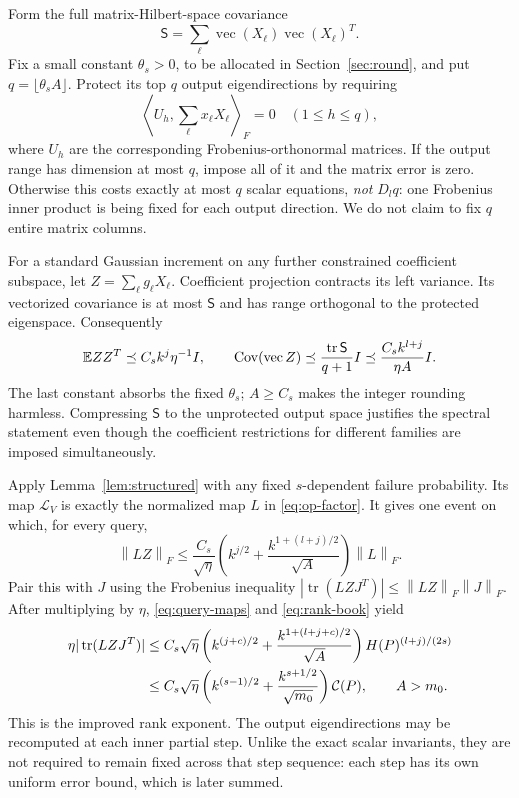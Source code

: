 \documentclass[11pt]{article}
\theoremstyle{remark}\newtheorem{remark}[theorem]{Remark}
\newcommand{\tr}{\operatorname{tr}}\newcommand{\rank}{\operatorname{rank}}
\newcommand{\norm}[1]{\left\|#1\right\|}\newcommand{\ip}[2]{\left\langle #1,#2\right\rangle}
\newcommand{\cost}{\mathcal C}\newcommand{\OPT}{\mathsf{OPT}}
\begin{document}
Form the full matrix-Hilbert-space covariance
\[
 \mathsf S=\sum_\ell\operatorname{vec}(X_\ell)\operatorname{vec}(X_\ell)^T.
\]
Fix a small constant $\theta_s>0$, to be allocated in Section~\ref{sec:round}, and put $q=\lfloor\theta_s A\rfloor$. Protect its top $q$ output eigendirections by requiring
\begin{equation}\label{eq:new-constraints}
 \left\langle U_h,\sum_\ell x_\ell X_\ell\right\rangle_F=0
 \quad(1\le h\le q),
\end{equation}
where $U_h$ are the corresponding Frobenius-orthonormal matrices. If the output range has dimension at most $q$, impose all of it and the matrix error is zero. Otherwise this costs exactly at most $q$ scalar equations, \emph{not} $D_lq$: one Frobenius inner product is being fixed for each output direction. We do not claim to fix $q$ entire matrix columns.

For a standard Gaussian increment on any further constrained coefficient subspace, let $Z=\sum_\ell g_\ell X_\ell$. Coefficient projection contracts its left variance. Its vectorized covariance is at most $\mathsf S$ and has range orthogonal to the protected eigenspace. Consequently
\begin{equation}\label{eq:new-fullcov}
 \E ZZ^T\preceq C_s k^j\eta^{-1}I,\qquad
 \operatorname{Cov}(\operatorname{vec}Z)
 \preceq\frac{\tr\mathsf S}{q+1}I
 \preceq\frac{C_s k^{l+j}}{\eta A}I.
\end{equation}
The last constant absorbs the fixed $\theta_s$; $A\ge C_s$ makes the integer rounding harmless. Compressing $\mathsf S$ to the unprotected output space justifies the spectral statement even though the coefficient restrictions for different families are imposed simultaneously.

Apply Lemma~\ref{lem:structured} with any fixed $s$-dependent failure probability. Its map $\mathcal L_V$ is exactly the normalized map $L$ in \eqref{eq:op-factor}. It gives one event on which, for every query,
\begin{equation}\label{eq:new-structured-cost}
 \norm{LZ}_F
 \le\frac{C_s}{\sqrt\eta}
 \left(k^{j/2}+\frac{k^{1+(l+j)/2}}{\sqrt A}\right)\norm L_F.
\end{equation}
Pair this with $J$ using the Frobenius inequality
$|\tr(LZJ^T)|\le\norm{LZ}_F\norm{J}_F$.
After multiplying by $\eta$, \eqref{eq:query-maps} and \eqref{eq:rank-book} yield
\begin{align}
 \eta|\tr(LZJ^T)|
 &\le C_s\sqrt\eta\left(k^{(j+c)/2}+\frac{k^{1+(l+j+c)/2}}{\sqrt A}\right)
 H(P)^{(l+j)/(2s)}\notag\\
 &\le C_s\sqrt\eta\left(k^{(s-1)/2}+\frac{k^{s+1/2}}{\sqrt{m_0}}\right)\cost(P),
 \qquad A>m_0.\label{eq:protected-error}
\end{align}
This is the improved rank exponent. The output eigendirections may be recomputed at each inner partial step. Unlike the exact scalar invariants, they are not required to remain fixed across that step sequence: each step has its own uniform error bound, which is later summed.
\end{document}
